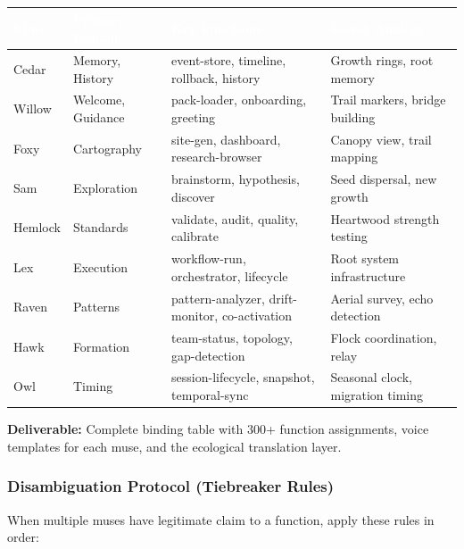 \documentclass[11pt,letterpaper]{article}
\newcommand{\tableheader}[1]{\textbf{\sffamily\textcolor{white}{#1}}}
\begin{document}
\begin{center}
\begin{tabularx}{\textwidth}{L{2cm}L{2.8cm}L{2.8cm}X}
\toprule
{}
\tableheader{Muse} & \tableheader{Primary Domain} & \tableheader{Key Functions} & \tableheader{Forest Analogy} \\
\midrule
Cedar & Memory, History & event-store, timeline, rollback, history & Growth rings, root memory \\
Willow & Welcome, Guidance & pack-loader, onboarding, greeting & Trail markers, bridge building \\
Foxy & Cartography & site-gen, dashboard, research-browser & Canopy view, trail mapping \\
Sam & Exploration & brainstorm, hypothesis, discover & Seed dispersal, new growth \\
Hemlock & Standards & validate, audit, quality, calibrate & Heartwood strength testing \\
Lex & Execution & workflow-run, orchestrator, lifecycle & Root system infrastructure \\
Raven & Patterns & pattern-analyzer, drift-monitor, co-activation & Aerial survey, echo detection \\
Hawk & Formation & team-status, topology, gap-detection & Flock coordination, relay \\
Owl & Timing & session-lifecycle, snapshot, temporal-sync & Seasonal clock, migration timing \\
\bottomrule
\end{tabularx}
\end{center}

\textbf{Deliverable:} Complete binding table with 300+ function assignments, voice templates for each muse, and the ecological translation layer.

\subsubsection{Disambiguation Protocol (Tiebreaker Rules)}

When multiple muses have legitimate claim to a function, apply these rules in order:
\end{document}

